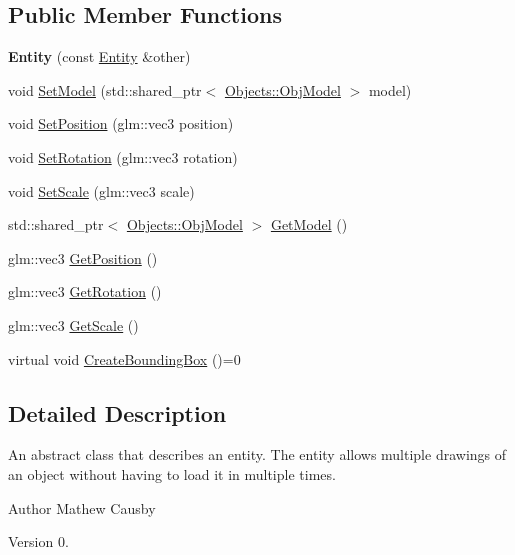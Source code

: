 \subsection*{Public Member Functions}
\begin{DoxyCompactItemize}
\item 
\mbox{\label{class_objects_1_1_entity_ac432b784f855810ccba93d2e0168fedf}} 
{\bfseries Entity} (const \hyperlink{class_objects_1_1_entity}{Entity} \&other)
\item 
void \hyperlink{class_objects_1_1_entity_a1c4c5744e19cf3c201af92c390c492c4}{Set\+Model} (std\+::shared\+\_\+ptr$<$ \hyperlink{class_objects_1_1_obj_model}{Objects\+::\+Obj\+Model} $>$ model)
\item 
void \hyperlink{class_objects_1_1_entity_a53612458c6bd047cbf89d4ee8bcfdf91}{Set\+Position} (glm\+::vec3 position)
\item 
void \hyperlink{class_objects_1_1_entity_a26e73e8b7f3ed5b3583b14ccba2fd459}{Set\+Rotation} (glm\+::vec3 rotation)
\item 
void \hyperlink{class_objects_1_1_entity_af1cd8b1f5688d01647df4e5ea1d415ae}{Set\+Scale} (glm\+::vec3 scale)
\item 
std\+::shared\+\_\+ptr$<$ \hyperlink{class_objects_1_1_obj_model}{Objects\+::\+Obj\+Model} $>$ \hyperlink{class_objects_1_1_entity_ab11c284129ded400940d924965c70399}{Get\+Model} ()
\item 
glm\+::vec3 \hyperlink{class_objects_1_1_entity_a5ee0431c29c1912dcd6c1607fa051b74}{Get\+Position} ()
\item 
glm\+::vec3 \hyperlink{class_objects_1_1_entity_af859452e323ac3340ad7ac8f74bd6682}{Get\+Rotation} ()
\item 
glm\+::vec3 \hyperlink{class_objects_1_1_entity_accdd401dc7d81b86f1c56e0eba8e515b}{Get\+Scale} ()
\item 
virtual void \hyperlink{class_objects_1_1_entity_a3fc51fcad3f731410589f7ab0e3dbe7e}{Create\+Bounding\+Box} ()=0
\end{DoxyCompactItemize}


\subsection{Detailed Description}
An abstract class that describes an entity. The entity allows multiple drawings of an object without having to load it in multiple times. \begin{DoxyAuthor}{Author}
Mathew Causby 
\end{DoxyAuthor}
\begin{DoxyVersion}{Version}
0. 
\end{DoxyVersion}


